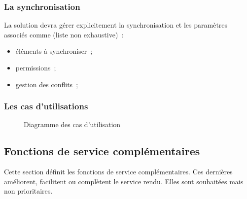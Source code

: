 \subsubsection{La synchronisation}
La solution devra gérer explicitement la synchronisation et les paramètres associés comme (liste non exhaustive)~:
\begin{itemize}
\item éléments à synchroniser~;
\item permissions~;
\item gestion des conflits~;
\end{itemize}

\subsubsection{Les cas d'utilisations}
\begin{figure}
\caption{Diagramme des cas d'utilisation}
\end{figure}

\subsection{Fonctions de service complémentaires}
Cette section définit les fonctions de service complémentaires. Ces dernières améliorent, facilitent ou complètent le service rendu. Elles sont souhaitées mais non prioritaires.

